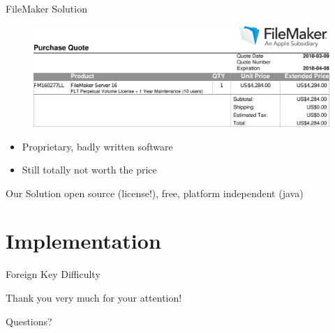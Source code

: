 \documentclass[xcolor=x11names, aspectratio=169,usenames,dvipsnames]{beamer}
\begin{document}
\begin{frame}{FileMaker Solution}
\begin{figure}
\includegraphics[width=\linewidth]{img/order.png}
\end{figure}\vspace{-2em}
\begin{itemize}
\item Proprietary, badly written software
\item Still totally not worth the price
\end{itemize}
\end{frame}

\begin{frame}{Our Solution}
open source (license!), free, platform independent (java)
\end{frame}

\section{Implementation}

\begin{frame}{Foreign Key Difficulty}
\begin{figure}
	\begin{tikzpicture}
	
	\end{tikzpicture}
\end{figure}
\end{frame}

\begin{frame}[plain]
\vfill\vfill\vfill
\begin{center}\Large
Thank you very much for your attention!\\\bigskip

Questions?
\end{center}\vfill\vfill
\end{frame}

\maketitle
\end{document}
